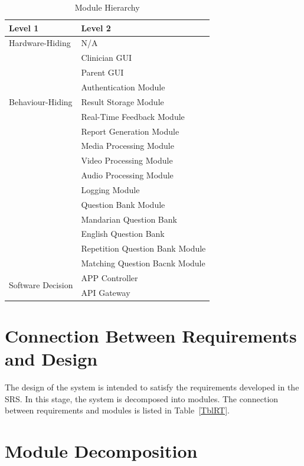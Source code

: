 \documentclass[12pt, titlepage]{article}
\begin{document}
\begin{table}[h!]
  \centering
  \begin{tabular}{p{} p{}}
  \toprule
  \textbf{Level 1} & \textbf{Level 2}\\
  \midrule
  
  {Hardware-Hiding} & N/A \\
  \midrule
  
  \multirow{7}{0.3\textwidth}{Behaviour-Hiding} & Clinician GUI\\
  & Parent GUI\\
  & Authentication Module\\
  & Result Storage Module\\
  & Real-Time Feedback Module\\ 
  & Report Generation Module\\
  & Media Processing Module\\
  & Video Processing Module\\
  & Audio Processing Module\\
  & Logging Module\\
  & Question Bank Module\\
  & Mandarian Question Bank\\
  & English Question Bank\\
  & Repetition Question Bank Module\\
  & Matching Question Bacnk Module\\
  \midrule
  
  \multirow{3}{0.3\textwidth}{Software Decision} & {APP Controller}\\
  & API Gateway\\
  \bottomrule
  
  \end{tabular}
  \caption{Module Hierarchy}
  \label{TblMH}
  \end{table}

\section{Connection Between Requirements and Design} \label{SecConnection}

The design of the system is intended to satisfy the requirements developed in
the SRS. In this stage, the system is decomposed into modules. The connection
between requirements and modules is listed in Table~\ref{TblRT}.

\section{Module Decomposition} \label{SecMD}
\end{document}
